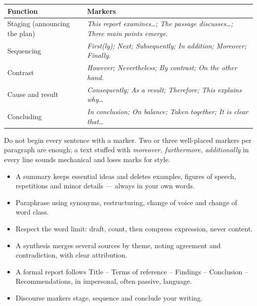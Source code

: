 \documentclass[11pt]{article}
\begin{document}
\begin{center}
\begin{tabularx}{\linewidth}{|l|X|}
\hline
\rowcolor{popblueL} \textbf{Function} & \textbf{Markers} \\
\hline
Staging (announcing the plan) & \emph{This report examines\ldots; The passage discusses\ldots; Three main points emerge.} \\
\hline
Sequencing & \emph{First(ly); Next; Subsequently; In addition; Moreover; Finally.} \\
\hline
Contrast & \emph{However; Nevertheless; By contrast; On the other hand.} \\
\hline
Cause and result & \emph{Consequently; As a result; Therefore; This explains why\ldots} \\
\hline
Concluding & \emph{In conclusion; On balance; Taken together; It is clear that\ldots} \\
\hline
\end{tabularx}
\end{center}

\begin{attention}
Do not begin every sentence with a marker. Two or three well-placed markers per paragraph are enough; a text stuffed with \emph{moreover, furthermore, additionally} in every line sounds mechanical and loses marks for style.
\end{attention}

\begin{aretenir}
\begin{itemize}
\item A summary keeps essential ideas and deletes examples, figures of speech, repetitions and minor details --- always in your own words.
\item Paraphrase using synonyms, restructuring, change of voice and change of word class.
\item Respect the word limit: draft, count, then compress expression, never content.
\item A synthesis merges several sources by theme, noting agreement and contradiction, with clear attribution.
\item A formal report follows Title -- Terms of reference -- Findings -- Conclusion -- Recommendations, in impersonal, often passive, language.
\item Discourse markers stage, sequence and conclude your writing.
\end{itemize}
\end{aretenir}
\end{document}
